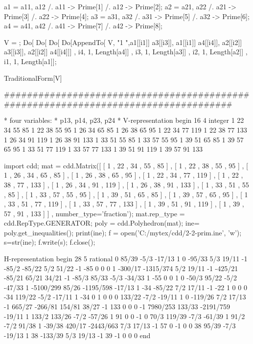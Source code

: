 
a1 = {a11, a12} /. a11 -> Prime[1] /. a12 -> Prime[2];
a2 = {a21, a22} /. a21 -> Prime[3] /. a22 -> Prime[4];
a3 = {a31, a32} /. a31 -> Prime[5] /. a32 -> Prime[6];
a4 = {a41, a42} /. a41 -> Prime[7] /. a42 -> Prime[8];


V = {};
Do[
  Do[
   Do[
    Do[AppendTo[
      V, {"1   ",a1[[i1]] a3[[i3]], a1[[i1]] a4[[i4]], a2[[i2]] a3[[i3]],
       a2[[i2]] a4[[i4]]}]
     , {i4, 1, Length[a4]}]
    , {i3, 1, Length[a3]}]
   , {i2, 1, Length[a2]}]
  , {i1, 1, Length[a1]}];

TraditionalForm[V]


###################################################################################

* four variables:
* p13, p14, p23, p24
*
V-representation
begin
16   4   integer
1       22      34      55      85
1       22      38      55      95
1       26      34      65      85
1       26      38      65      95
1       22      34      77      119
1       22      38      77      133
1       26      34      91      119
1       26      38      91      133
1       33      51      55      85
1       33      57      55      95
1       39      51      65      85
1       39      57      65      95
1       33      51      77      119
1       33      57      77      133
1       39      51      91      119
1       39      57      91      133





import cdd;
mat = cdd.Matrix([
[ 1 ,      22  ,    34  ,    55  ,    85    ] ,
[ 1 ,      22  ,    38  ,    55  ,    95    ] ,
[ 1 ,      26  ,    34  ,    65  ,    85    ] ,
[ 1 ,      26  ,    38  ,    65  ,    95    ] ,
[ 1 ,      22  ,    34  ,    77  ,    119   ] ,
[ 1 ,      22  ,    38  ,    77  ,    133   ] ,
[ 1 ,      26  ,    34  ,    91  ,    119   ] ,
[ 1 ,      26  ,    38  ,    91  ,    133   ] ,
[ 1 ,      33  ,    51  ,    55  ,    85    ] ,
[ 1 ,      33  ,    57  ,    55  ,    95    ] ,
[ 1 ,      39  ,    51  ,    65  ,    85    ] ,
[ 1 ,      39  ,    57  ,    65  ,    95    ] ,
[ 1 ,      33  ,    51  ,    77  ,    119   ] ,
[ 1 ,      33  ,    57  ,    77  ,    133   ] ,
[ 1 ,      39  ,    51  ,    91  ,    119   ] ,
[ 1 ,      39  ,    57  ,    91  ,    133   ] ] ,
number_type='fraction');
mat.rep_type = cdd.RepType.GENERATOR;
poly = cdd.Polyhedron(mat);
ine= poly.get_inequalities();
print(ine);
f = open('C:/mytex/cdd/2-2-prim.ine', 'w');
s=str(ine);
f.write(s);
f.close();


H-representation
begin
 28 5 rational
 0 85/39 -5/3 -17/13 1
 0 -95/33 5/3 19/11 -1
 -85/2 -85/22 5/2 51/22 -1
 -85 0 0 0 1
 -300/17 -1315/374 5/2 19/11 -1
 -425/21 -85/21 65/21 34/21 -1
 -85/3 85/33 -5/3 -34/33 1
 -55 0 0 1 0
 -50/3 95/22 -5/2 -47/33 1
 -5100/299 85/26 -1195/598 -17/13 1
 -34 -85/22 7/2 17/11 -1
 -22 1 0 0 0
 -34 119/22 -5/2 -17/11 1
 -34 0 1 0 0
 0 133/22 -7/2 -19/11 1
 0 -119/26 7/2 17/13 -1
 665/27 -266/81 154/81 38/27 -1
 133 0 0 0 -1
 7980/253 133/33 -2191/759 -19/11 1
 133/2 133/26 -7/2 -57/26 1
 91 0 0 -1 0
 70/3 119/39 -7/3 -61/39 1
 91/2 -7/2 91/38 1 -39/38
 420/17 -2443/663 7/3 17/13 -1
 57 0 -1 0 0
 38 95/39 -7/3 -19/13 1
 38 -133/39 5/3 19/13 -1
 39 -1 0 0 0
end
